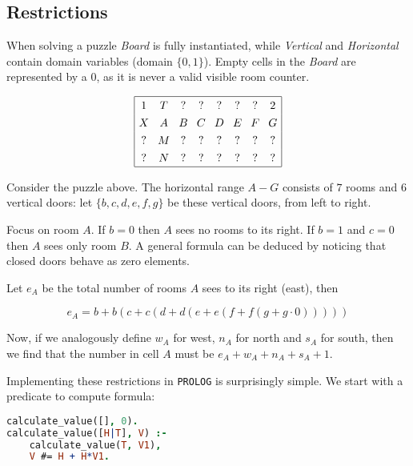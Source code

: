 \documentclass[runningheads]{llncs}
\newcommand*{\cc}[2]{\multicolumn{1}{#1}{#2}}
\begin{document}
\subsection{Restrictions}
\label{subsec:solutionrestrictions}

When solving a puzzle \textsl{Board} is fully instantiated, while \textsl{Vertical} and \textsl{Horizontal} contain domain variables (domain $\{0,1\}$). Empty cells in the \textsl{Board} are represented by a $0$, as it is never a valid visible room counter.

\begin{equation*}
\arraycolsep=4.0pt\def\arraystretch{1.3}
\begin{array}[c]{|c c c c c c c c|}
\hline
1 & \cc{ c }{T} & \cc{ c }{?} & \cc{ c }{?} & \cc{ c }{?} & \cc{ c }{?} & \cc{ c }{?} & 2\\
%
X & \cc{ c }{A} & \cc{ c }{B} & \cc{ c }{C} & \cc{ c }{D} & \cc{ c }{E} & \cc{ c }{F} & G\\
%
? & \cc{ c }{M} & \cc{ c }{?} & \cc{ c }{?} & \cc{ c }{?} & \cc{ c }{?} & \cc{ c }{?} & ?\\
%
? & \cc{ c }{N} & \cc{ c }{?} & \cc{ c }{?} & \cc{ c }{?} & \cc{ c }{?} & \cc{ c }{?} & ?\\
\hline
\end{array}
\end{equation*}

Consider the puzzle above. The horizontal range $A-G$ consists of $7$ rooms and $6$ vertical doors: let $\{b,c,d,e,f,g\}$ be these vertical doors, from left to right.

Focus on room $A$.
If $b=0$ then $A$ sees no rooms to its right. If $b=1$ and $c=0$ then $A$ sees only room $B$.
A general formula can be deduced by noticing that closed doors behave as zero elements.

Let $e_A$ be the total number of rooms $A$ sees to its right (east), then

\begin{equation}\label{eq:acc}
e_A=b+b(c+c(d+d(e+e(f+f(g+g\cdot 0)))))
\end{equation}

Now, if we analogously define $w_A$ for west, $n_A$ for north and $s_A$ for south, then we find that the number in cell $A$ must be $e_A+w_A+n_A+s_A+1$.

Implementing these restrictions in \texttt{PROLOG} is surprisingly simple. We start with a predicate to compute formula:

\begin{center}
\begin{minipage}{0.45\textwidth}
\centering\ttfamily
\begin{lstlisting}[language=Prolog]
calculate_value([], 0).
calculate_value([H|T], V) :-
    calculate_value(T, V1),
    V #= H + H*V1.
\end{lstlisting}
\end{minipage}
\end{center}
\end{document}

